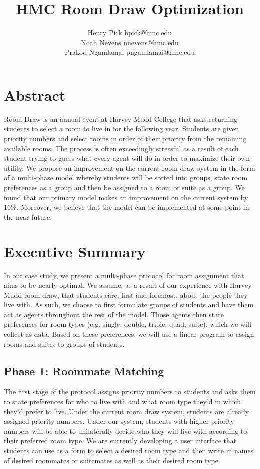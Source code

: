 \documentclass[12pt]{article}
\author{Henry Pick \small hpick@hmc.edu \\
\large Noah Nevens \small nnevens@hmc.edu \\
\large Prakod Ngamlamai \small pngamlamai@hmc.edu}
\title{HMC Room Draw Optimization}
\begin{document}
    \maketitle
    \section*{Abstract}
    Room Draw is an annual event at Harvey Mudd College that asks returning students to select a room to live in for the following year. Students are given priority numbers and select rooms in order of their priority from the remaining available rooms. The process is often exceedingly stressful as a result of each student trying to guess what every agent will do in order to maximize their own utility. We propose an improvement on the current room draw system in the form of a multi-phase model whereby students will be sorted into groups, state room preferences as a group and then be assigned to a room or suite as a group. We found that our primary model makes an improvement on the current system by 16\%. Moreover, we believe that the model can be implemented at some point in the near future. 
    \section*{Executive Summary}
    In our case study, we present a multi-phase protocol for room assignment that aims to be nearly optimal. We assume, as a result of our experience with Harvey Mudd room draw, that students care, first and foremost, about the people they live with. As such, we choose to first formulate groups of students and have them act as agents throughout the rest of the model. Those agents then state preferences for room types (e.g. single, double, triple, quad, suite), which we will collect as data. Based on these preferences, we will use a linear program to assign rooms and suites to groups of students.
    
    \subsection*{Phase 1: Roommate Matching}
    The first stage of the protocol assigns priority numbers to students and asks them to state preferences for who to live with and what room type they'd in which they'd prefer to live. Under the current room draw system, students are already assigned priority numbers. Under our system, students with higher priority numbers will be able to unilaterally decide who they will live with according to their preferred room type. We are currently developing a user interface that students can use as a form to select a desired room type and then write in names of desired roommates or suitemates as well as their desired room type. 
    
\end{document}
